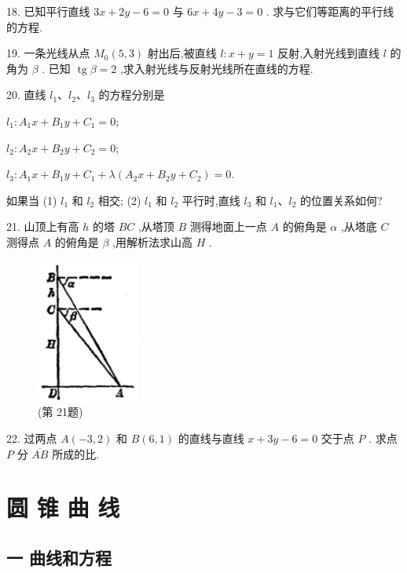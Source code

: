 \documentclass[lang=cn,newtx,10pt,scheme=chinese]{elegantbook}
\begin{document}
18. 已知平行直线 \({3x} + {2y} - 6 = 0\) 与 \({6x} + {4y} - 3 = 0\) . 求与它们等距离的平行线的方程.

19. 一条光线从点 \({M}_{0}\left( {5,3}\right)\) 射出后,被直线 \(l : x + y = 1\) 反射,入射光线到直线 \(l\) 的角为 \(\beta\) . 已知 \(\operatorname{tg}\beta = 2\) ,求入射光线与反射光线所在直线的方程.

20. 直线 \({l}_{1}\text{、}{l}_{2}\text{、}{l}_{3}\) 的方程分别是

\({l}_{1} : {A}_{1}x + {B}_{1}y + {C}_{1} = 0;\)

\({l}_{2} : {A}_{2}x + {B}_{2}y + {C}_{2} = 0;\)

\({l}_{3} : {A}_{1}x + {B}_{1}y + {C}_{1} + \lambda \left( {{A}_{2}x + {B}_{2}y + {C}_{2}}\right) = 0.\)

如果当 (1) \({l}_{1}\) 和 \({l}_{2}\) 相交; (2) \({l}_{1}\) 和 \({l}_{2}\) 平行时,直线 \({l}_{3}\) 和 \({l}_{1}\text{、}{l}_{2}\) 的位置关系如何?

21. 山顶上有高 \(h\) 的塔 \({BC}\) ,从塔顶 \(B\) 测得地面上一点 \(A\) 的俯角是 \(\alpha\) ,从塔底 \(C\) 测得点 \(A\) 的俯角是 \(\beta\) ,用解析法求山高 \(H\) .

\begin{figure}[h]
  \centering
  \includegraphics[max width=0.3\textwidth]{images/01912cc2-ffb6-728e-9ae7-b113ff05c64b_64_551024.jpg}
  \caption{(第 21题)}
\end{figure}



22. 过两点 \(A\left( {-3,2}\right)\) 和 \(B\left( {6,1}\right)\) 的直线与直线 \(x + {3y} - 6 = 0\) 交于点 \(P\) . 求点 \(P\) 分 \(\overline{AB}\) 所成的比.


\chapter{圆 锥 曲 线}

\section*{一 曲线和方程}
\end{document}
